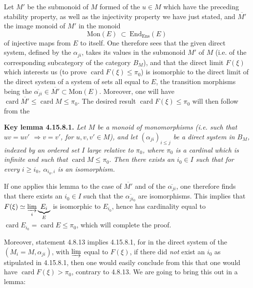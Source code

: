 \documentclass[11pt]{article}
\newcommand{\printedpage}[1]{\marginpar{\footnotesize p.~#1}}
\newcommand{\msp}[1]{\marginpar{\footnotesize [#1]}}
\newcommand{\card}{\operatorname{card}}
\begin{document}
Let $M'$ be the submonoid of $M$ formed of the $u \in M$ which have the preceding stability property, as well as the injectivity property we have just stated, and $\overline{M'}$ the image monoid of $M'$ in the monoid
\[
\mathrm{Mon}(E) \ \subset \ \mathrm{End}_{\mathrm{Ens}}(E)
\]
\msp{page 456}
of injective maps from $E$ to itself. One therefore sees that the given direct system, defined by the $\alpha_{ji}$, takes its values in the submonoid $M'$ of $M$ (i.e. of the corresponding subcategory of the category $B_M$), and that the direct limit $F(\xi)$ which interests us (to prove $\card F(\xi) \leqslant \pi_0$) is isomorphic to the direct limit of the direct system of a system of sets all equal to $E$, the transition morphisms being the $\overline{\alpha_{ji}} \in \overline{M'} \subset \mathrm{Mon}(E)$. Moreover, one will have $\card \overline{M'} \leqslant \card M \leqslant \pi_0$. The desired result $\card F(\xi) \leqslant \pi_0$ will then follow from the

\textbf{Key lemma 4.15.8.1.} \textit{Let $M$ be a monoid of monomorphisms (i.e. such that $uv = uv'$ $\Longrightarrow v = v'$, for $u,v,v' \in M$), and let $(\alpha_{ji})_{i\leqslant j}$ be a direct system in $B_M$, indexed by an ordered set $I$ large relative to $\pi_0$, where $\pi_0$ is a cardinal}
\printedpage{177}
\msp{page 457}
\textit{which is infinite and such that} $\card M \leqslant \pi_0$. \textit{Then there exists an $i_0 \in I$ such that for every $i \geqslant i_0$, $\alpha_{i_0,i}$ is an isomorphism.}

If one applies this lemma to the case of $\overline{M'}$ and of the $\overline{\alpha_{ji}}$, one therefore finds that there exists an $i_0 \in I$ such that the $\overline{\alpha_{ji_0}}$ are isomorphisms. This implies that $F(\xi) \simeq \varinjlim\limits_{i} \underbrace{E_i}_{E}$ is isomorphic to $E_{i_0}$, hence has cardinality equal to $\card E_{i_0} = \card E \leqslant \pi_0$, which will complete the proof.

Moreover, statement 4.8.13 implies 4.15.8.1, for in the direct system of the $(M_i = M, \alpha_{ji})$, with $\varinjlim$ equal to $F(\xi)$, if there did \textit{not} exist an $i_0$ as stipulated in 4.15.8.1, then one would easily conclude from this that one would have $\card F(\xi) > \pi_0$, contrary to 4.8.13. We are going to bring this out in a lemma:
\end{document}
